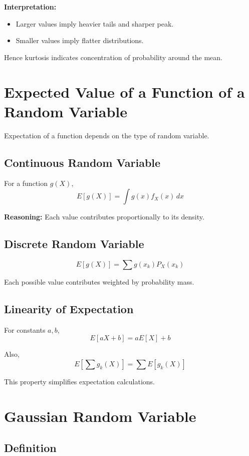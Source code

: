 \documentclass{article}
\begin{document}
\textbf{Interpretation:}
\begin{itemize}
    \item Larger values imply heavier tails and sharper peak.
    \item Smaller values imply flatter distributions.
\end{itemize}

Hence kurtosis indicates concentration of probability around the mean.

\section{Expected Value of a Function of a Random Variable}

Expectation of a function depends on the type of random variable.

\subsection{Continuous Random Variable}

For a function $g(X)$,
\[
E[g(X)] = \int g(x) f_X(x)\, dx
\]

\textbf{Reasoning:} Each value contributes proportionally to its density.

\subsection{Discrete Random Variable}

\[
E[g(X)] = \sum g(x_k) P_X(x_k)
\]

Each possible value contributes weighted by probability mass.

\subsection{Linearity of Expectation}

For constants $a, b$,
\[
E[aX + b] = aE[X] + b
\]

Also,
\[
E\left[\sum g_k(X)\right] = \sum E[g_k(X)]
\]

This property simplifies expectation calculations.

\section{Gaussian Random Variable}

\subsection{Definition}
\end{document}

